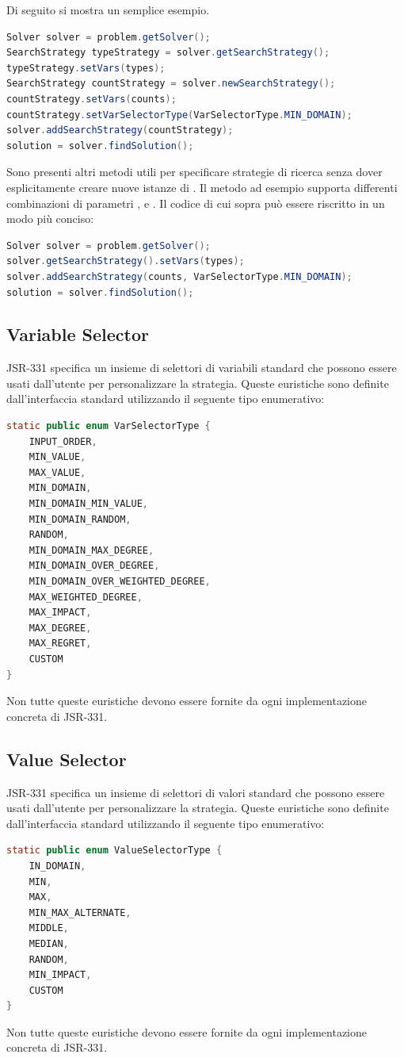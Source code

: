 Di seguito si mostra un semplice esempio.
\begin{lstlisting}[language = Java,
                   caption = {due differenti strategie.}]
Solver solver = problem.getSolver();
SearchStrategy typeStrategy = solver.getSearchStrategy();
typeStrategy.setVars(types);
SearchStrategy countStrategy = solver.newSearchStrategy();
countStrategy.setVars(counts);
countStrategy.setVarSelectorType(VarSelectorType.MIN_DOMAIN);
solver.addSearchStrategy(countStrategy);
solution = solver.findSolution();
\end{lstlisting}
Sono presenti altri metodi utili per specificare strategie di ricerca senza
dover esplicitamente creare nuove istanze di . Il
metodo  ad esempio supporta differenti combinazioni di 
parametri ,  e . Il codice 
di cui sopra può essere riscritto in un modo più conciso:
\begin{lstlisting}[language = Java,
                   frame = single]
Solver solver = problem.getSolver();
solver.getSearchStrategy().setVars(types);
solver.addSearchStrategy(counts, VarSelectorType.MIN_DOMAIN);
solution = solver.findSolution();
\end{lstlisting}

\subsection{Variable Selector}
JSR-331 specifica un insieme di selettori di variabili standard che possono
essere usati dall'utente per personalizzare la strategia. Queste
euristiche sono definite dall'interfaccia standard 
utilizzando il seguente tipo enumerativo:
\begin{lstlisting}[language = Java,
                   frame = single]
static public enum VarSelectorType {
    INPUT_ORDER,
    MIN_VALUE,
    MAX_VALUE,
    MIN_DOMAIN,
    MIN_DOMAIN_MIN_VALUE,
    MIN_DOMAIN_RANDOM,
    RANDOM,
    MIN_DOMAIN_MAX_DEGREE,
    MIN_DOMAIN_OVER_DEGREE,
    MIN_DOMAIN_OVER_WEIGHTED_DEGREE,
    MAX_WEIGHTED_DEGREE,
    MAX_IMPACT,
    MAX_DEGREE,
    MAX_REGRET,
    CUSTOM
}
\end{lstlisting}
Non tutte queste euristiche devono essere fornite da ogni implementazione
concreta di JSR-331.

\subsection{Value Selector}
JSR-331 specifica un insieme di selettori di valori standard che possono
essere usati dall'utente per personalizzare la strategia. Queste
euristiche sono definite dall'interfaccia standard 
utilizzando il seguente tipo enumerativo:
\begin{lstlisting}[language = Java,
                   frame = single]
static public enum ValueSelectorType {
    IN_DOMAIN,
    MIN,
    MAX,
    MIN_MAX_ALTERNATE,
    MIDDLE,
    MEDIAN,
    RANDOM,
    MIN_IMPACT,
    CUSTOM
}
\end{lstlisting}
Non tutte queste euristiche devono essere fornite da ogni implementazione
concreta di JSR-331.

